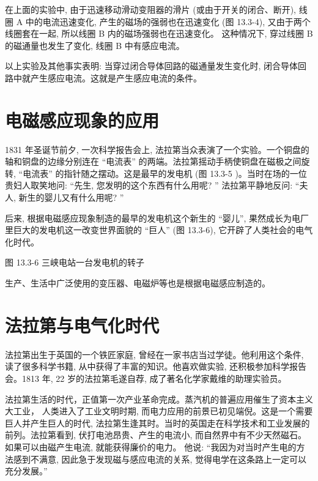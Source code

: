 \documentclass[10pt]{article}
\begin{document}
在上面的实验中, 由于迅速移动滑动变阻器的滑片 (或由于开关的闭合、断开), 线圈 A 中的电流迅速变化, 产生的磁场的强弱也在迅速变化 (图 13.3-4), 又由于两个线圈套在一起, 所以线圈 B 内的磁场强弱也在迅速变化。 这种情况下, 穿过线圈 B 的磁通量也发生了变化, 线圈 B 中有感应电流。

以上实验及其他事实表明: 当穿过闭合导体回路的磁通量发生变化时, 闭合导体回路中就产生感应电流。这就是产生感应电流的条件。

\section*{电磁感应现象的应用}

1831 年圣诞节前夕, 一次科学报告会上, 法拉第当众表演了一个实验。一个铜盘的轴和铜盘的边缘分别连在 “电流表” 的两端。法拉第摇动手柄使铜盘在磁极之间旋转, “电流表” 的指针随之摆动。这是最早的发电机 (图 13.3-5 )。当时在场的一位贵妇人取笑地问: “先生, 您发明的这个东西有什么用呢? ” 法拉第平静地反问: “夫人, 新生的婴儿又有什么用呢? ”

后来, 根据电磁感应现象制造的最早的发电机这个新生的 “婴儿”, 果然成长为电厂里巨大的发电机这一改变世界面貌的 “巨人” (图 13.3-6), 它开辟了人类社会的电气化时代。

\begin{mdframed}

图 13.3-6 三峡电站一台发电机的转子

\end{mdframed}

生产、生活中广泛使用的变压器、电磁炉等也是根据电磁感应制造的。

\section*{法拉第与电气化时代}

法拉第出生于英国的一个铁匠家庭, 曾经在一家书店当过学徒。他利用这个条件, 读了很多科学书籍, 从中获得了丰富的知识。他喜欢做实验, 还积极参加科学报告会。1813 年, 22 岁的法拉第毛遂自荐, 成了著名化学家戴维的助理实验员。

法拉第生活的时代，正值第一次产业革命完成。蒸汽机的普遍应用催生了资本主义大工业， 人类进入了工业文明时期, 而电力应用的前景已初见端倪。这是一个需要巨人并产生巨人的时代, 法拉第生逢其时。当时的英国走在科学技术和工业发展的前列。法拉第看到, 伏打电池昂贵、产生的电流小, 而自然界中有不少天然磁石。如果可以由磁产生电流, 就能获得廉价的电力。 他说: “我因为对当时产生电的方法感到不满意, 因此急于发现磁与感应电流的关系, 觉得电学在这条路上一定可以充分发展。”
\end{document}
